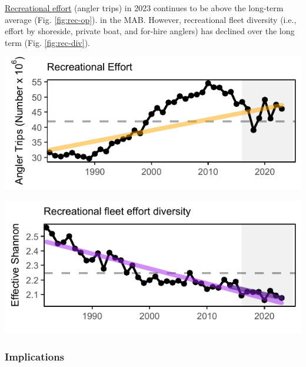 \documentclass[
  10pt,
]{article}
\let\origfigure\figure
\let\endorigfigure\endfigure
\renewenvironment{figure}[1][2] {
    \expandafter\origfigure\expandafter[H]
} {
    \endorigfigure
}
\begin{document}
\href{https://noaa-edab.github.io/catalog/recdat.html}{Recreational effort} (angler trips) in 2023 continues to be above the long-term average (Fig. \ref{fig:rec-op}). in the MAB. However, recreational fleet diversity (i.e., effort by shoreside, private boat, and for-hire anglers) has declined over the long term (Fig. \ref{fig:rec-div}).

\begin{figure}

{\centering \includegraphics{midatlantic_files/figure-latex/rec-op-1} 

}

\caption{Recreational effort (number of trips, black) in the Mid-Atlantic, with significant increase (orange line).}\label{fig:rec-op}
\end{figure}

\begin{figure}

{\centering \includegraphics{midatlantic_files/figure-latex/rec-div-1} 

}

\caption{Recreational fleet effort diversity (black) in the Mid-Atlantic, with significant decrease (purple line).}\label{fig:rec-div}
\end{figure}

\subsubsection{Implications}\label{implications-2}
\end{document}
